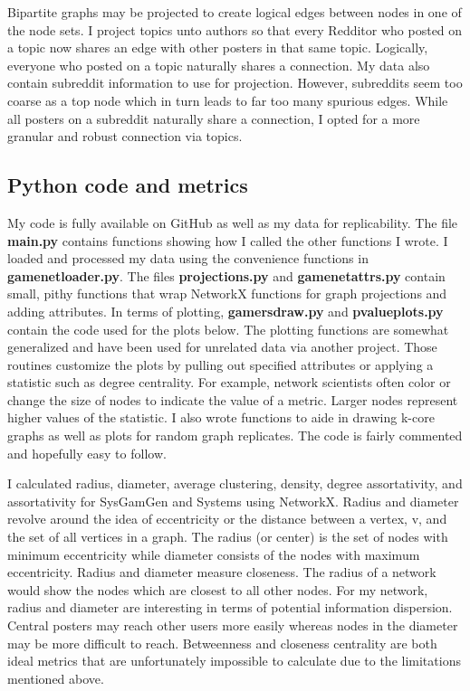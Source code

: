\documentclass[12pt, a4paper]{article}
\begin{document}
Bipartite graphs may be projected to create logical edges between nodes in one of the node sets. I project topics unto authors so that every Redditor who posted on a topic now shares an edge with other posters in that same topic. Logically, everyone who posted on a topic naturally shares a connection. My data also contain subreddit information to use for projection. However, subreddits seem too coarse as a top node which in turn leads to far too many spurious edges. While all posters on a subreddit naturally share a connection, I opted for a more granular and robust connection via topics.

\subsection{Python code and metrics}

My code is fully available on GitHub as well as my data for replicability. The file \textbf{main.py} contains functions showing how I called the other functions I wrote. I loaded and processed my data using the convenience functions in \textbf{gamenetloader.py}. The files \textbf{projections.py} and \textbf{gamenetattrs.py} contain small, pithy functions that wrap NetworkX functions for graph projections and adding attributes. In terms of plotting, \textbf{gamersdraw.py} and \textbf{pvalueplots.py} contain the code used for the plots below. The plotting functions are somewhat generalized and have been used for unrelated data via another project. Those routines customize the plots by pulling out specified attributes or applying a statistic such as degree centrality. For example, network scientists often color or change the size of nodes to indicate the value of a metric. Larger nodes represent higher values of the statistic. I also wrote functions to aide in drawing k-core graphs as well as plots for random graph replicates. The code is fairly commented and hopefully easy to follow.

I calculated radius, diameter, average clustering, density, degree assortativity, and assortativity for SysGamGen and Systems using NetworkX. Radius and diameter revolve around the idea of eccentricity or the distance between a vertex, v, and the set of all vertices in a graph. The radius (or center) is the set of nodes with minimum eccentricity while diameter consists of the nodes with maximum eccentricity. Radius and diameter measure closeness. The radius of a network would show the nodes which are closest to all other nodes. For my network, radius and diameter are interesting in terms of potential information dispersion. Central posters may reach other users more easily whereas nodes in the diameter may be more difficult to reach. Betweenness and closeness centrality are both ideal metrics that are unfortunately impossible to calculate due to the limitations mentioned above.
\end{document}
